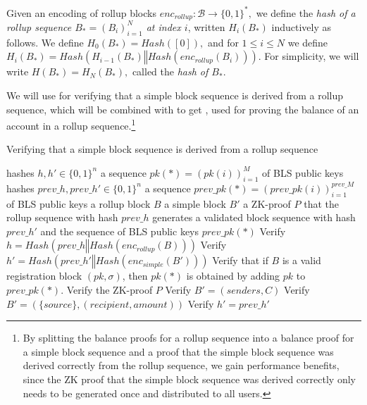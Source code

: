 \begin{defn}
  Given an encoding of rollup blocks \(enc_{rollup} : \mathcal{B} \rightarrow \{0,1\}^*,\) we define the \emph{hash of a rollup sequence \(B_* = (B_i)_{i=1}^N\) at index \(i\)}, written \(H_i(B_*)\) inductively as follows. We define \(H_0(B_*) = Hash([0]),\) and for \(1 \leq i \leq N\) we define \(H_i(B_*) = Hash(H_{i-1}(B_*) \mathbin\Vert Hash(enc_{rollup}(B_i))).\) For simplicity, we will write \(H(B_*) = H_N(B_*),\) called the \emph{hash of \(B_*\)}.
\end{defn}

We will use  for verifying that a simple block sequence is derived from a rollup sequence, which will be combined with  to get , used for proving the balance of an account in a rollup sequence.\footnote{By splitting the balance proofs for a rollup sequence into a balance proof for a simple block sequence and a proof that the simple block sequence was derived correctly from the rollup sequence, we gain performance benefits, since the ZK proof that the simple block sequence was derived correctly only needs to be generated once and distributed to all users.}

\begin{circuit}[H]
\caption{Verifying that a simple block sequence is derived from a rollup sequence}\label{alg:zkp-signature-validation}
\begin{algorithmic}[1]
\Public 
  \Statex hashes \(h,h' \in \{0,1\}^n\)
  \Statex a sequence \(pk(*) = (pk(i))_{i=1}^M\) of BLS public keys
\Private
  \Statex hashes \(prev\_h, prev\_h' \in \{0,1\}^n\)
  \Statex a sequence \(prev\_pk(*) = (prev\_pk(i))_{i=1}^{prev\_M}\) of BLS public keys
  \Statex a rollup block \(B\)
  \Statex a simple block \(B'\)
  \Statex a ZK-proof \(P\) that the rollup sequence with hash \(prev\_h\) generates a validated block sequence with hash \(prev\_h'\) and the sequence of BLS public keys \(prev\_pk(*)\)
  \State Verify \(h = Hash(prev\_h \mathbin\Vert Hash(enc_{rollup}(B)))\)
  \State Verify \(h' = Hash(prev\_h' \mathbin\Vert Hash(enc_{simple}(B')))\)
  \State Verify that if \(B\) is a valid registration block \((pk,\sigma)\), then \(pk(*)\) is obtained by adding \(pk\) to \(prev\_pk(*)\).
  \State Verify the ZK-proof \(P\)
    \State Verify \(B' = (senders, C)\)
    \State Verify \(B' = (\{source\}, (recipient, amount))\)
  \Else
    \State Verify \(h' = prev\_h'\)
  \EndIf
\end{algorithmic}
\end{circuit}

